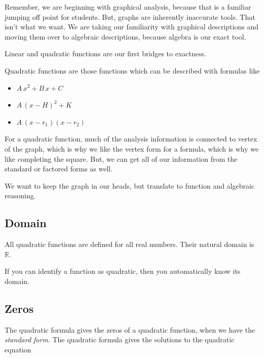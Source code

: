 \documentclass{ximera}
\begin{document}
Remember, we are beginning with graphical analysis, because that is a familiar jumping off point for students.  But, graphs are inherently inaccurate tools.  That isn't what we want. We are taking our familiarity with graphical descriptions and moving them over to algebraic descriptions, because algebra is our exact tool. 

Linear and quadratic functions are our first bridges to exactness. 


Quadratic functions are those functions which can be described with formulas like

\begin{itemize}
     \item $A \, x^2 + B \, x + C$
     \item $A \, (x - H)^2 + K$
     \item $A \, (x - r_1) (x-r_2)$
\end{itemize}

For a quadratic function, much of the analysis information is connected to vertex of the graph, which is why we like the vertex form for a formula, which is why we like completing the square.  But, we can get all of our information from the standard or factored forms as well. 

We want to keep the graph in our heads, but translate to function and algebraic reasoning. 





\subsection*{Domain} 

All quadratic functions are defined for all real numbers.  Their natural domain is $\mathbb{R}$. 

If you can identify a function as quadratic, then you automatically know its domain. 











\subsection*{Zeros}


The quadratic formula gives the zeros of a quadratic function, when we have the \textit{standard form}. The quadratic formula gives the solutions to the quadratic equation
\end{document}
